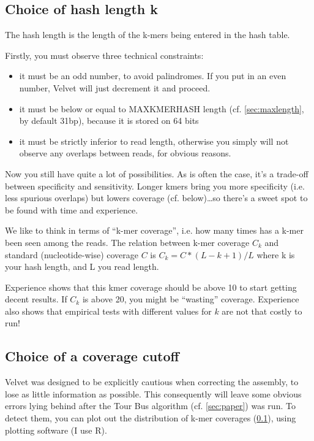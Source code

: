 \documentclass{article}
\begin{document}
\subsection{Choice of hash length k}

\label{sec:kmercov}

The hash length is the length of the k-mers being entered in the hash table.

Firstly, you must observe three technical constraints:
\begin{itemize}
\item it must be an odd number, to avoid palindromes. If you put in an even number, Velvet will just decrement it and proceed.
\item it must be below or equal to MAXKMERHASH length (cf. \ref{sec:maxlength}, by default 31bp), because it is stored on 64 bits
\item it must be strictly inferior to read length, otherwise you simply will not observe any overlaps between reads, for obvious reasons.
\end{itemize}

Now you still have quite a lot of possibilities. As is often the case, it's a trade-off between specificity and sensitivity. Longer kmers bring you more specificity (i.e. less spurious overlaps) but lowers coverage (cf. below)\ldots so there's a sweet spot to be found with time and experience.

We like to think in terms of ``k-mer coverage'', i.e. how many times has a k-mer been seen among the reads. The relation between k-mer coverage $C_k$ and standard (nucleotide-wise) coverage $C$ is $C_k = C * (L - k + 1) / L$ where k is your hash length, and L you read length. 

Experience shows that this kmer coverage should be above 10 to start getting decent results. If $C_k$ is above 20, you might be ``wasting'' coverage. Experience also shows that empirical tests with different values for $k$ are not that costly to run!

\subsection{Choice of a coverage cutoff}

\label{sec:covcutoff}

Velvet was designed to be explicitly cautious when correcting the assembly, to lose as little information as possible. This consequently will leave some obvious errors lying behind after the Tour Bus algorithm (cf. \ref{sec:paper}) was run. To detect them, you can plot out the distribution of k-mer coverages (\ref{sec:kmercov}), using plotting software (I use R).
\end{document}
